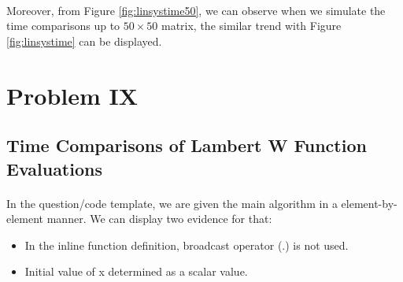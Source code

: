 \documentclass[letterpaper,12pt]{article}
\begin{document}
   \paragraph{}Moreover, from Figure \ref{fig:linsystime50}, we can observe when we simulate the time comparisons up to $50\times50$ matrix, the similar trend with Figure \ref{fig:linsystime} can be displayed.
   
   
\section{Problem IX}
\subsection{Time Comparisons of Lambert W Function Evaluations}
\label{timelambert}
\paragraph{} In the question/code template, we are given the main algorithm in a element-by-element manner. We can display two evidence for that:
\begin{itemize}
   \item In the inline function definition, broadcast operator (.) is not used.
   \item Initial value of x determined as a scalar value.
\end{itemize}
\end{document}
